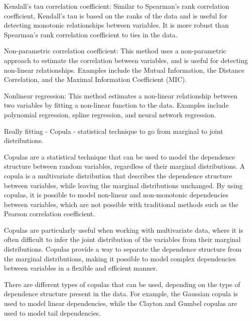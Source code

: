 \documentclass[12pt]{article} %
\theoremstyle{plain}
\begin{document}
	Kendall's tau correlation coefficient: Similar to Spearman's rank correlation coefficient, Kendall's tau is based on the ranks of the data and is useful for detecting monotonic relationships between variables. It is more robust than Spearman's rank correlation coefficient to ties in the data.
	
	Non-parametric correlation coefficient: This method uses a non-parametric approach to estimate the correlation between variables, and is useful for detecting non-linear relationships. Examples include the Mutual Information, the Distance Correlation, and the Maximal Information Coefficient (MIC).
	
	Nonlinear regression: This method estimates a non-linear relationship between two variables by fitting a non-linear function to the data. Examples include polynomial regression, spline regression, and neural network regression.
	
	
	Really fitting - Copula - statistical technique to go from marginal to joint distributions. 
	
	Copulas are a statistical technique that can be used to model the dependence structure between random variables, regardless of their marginal distributions. A copula is a multivariate distribution that describes the dependence structure between variables, while leaving the marginal distributions unchanged. By using copulas, it is possible to model non-linear and non-monotonic dependencies between variables, which are not possible with traditional methods such as the Pearson correlation coefficient.
	
	Copulas are particularly useful when working with multivariate data, where it is often difficult to infer the joint distribution of the variables from their marginal distributions. Copulas provide a way to separate the dependence structure from the marginal distributions, making it possible to model complex dependencies between variables in a flexible and efficient manner.
	
	There are different types of copulas that can be used, depending on the type of dependence structure present in the data. For example, the Gaussian copula is used to model linear dependencies, while the Clayton and Gumbel copulas are used to model tail dependencies.
	
\end{document}
